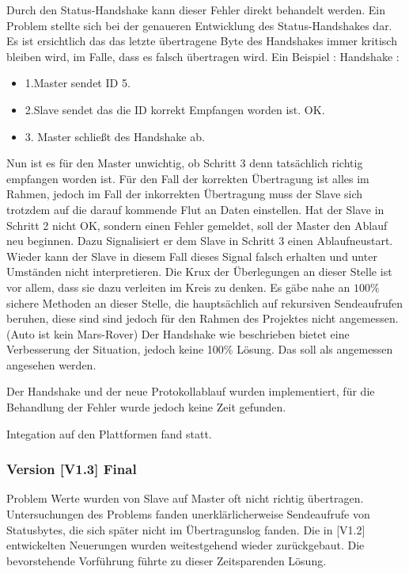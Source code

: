 \begin{itemize}
\begin{center}
\begin{center}

Durch den Status-Handshake kann dieser Fehler direkt behandelt werden.
Ein Problem stellte sich bei der genaueren Entwicklung des Status-Handshakes dar. Es ist ersichtlich das das letzte übertragene Byte des Handshakes immer kritisch bleiben wird, im Falle, dass es falsch übertragen wird. Ein Beispiel :
Handshake :
\begin{itemize}
	\item 1.Master sendet ID 5.
	\item 2.Slave sendet das die ID korrekt Empfangen worden ist. OK.
	\item 3. Master schließt des Handshake ab.
\end{itemize}

Nun ist es für den Master unwichtig, ob Schritt 3 denn tatsächlich richtig empfangen worden ist. Für den Fall der korrekten Übertragung ist alles im Rahmen, jedoch im Fall der inkorrekten Übertragung muss der Slave sich trotzdem auf die darauf kommende Flut an Daten einstellen.
Hat der Slave in Schritt 2 nicht OK, sondern einen Fehler gemeldet, soll der Master den Ablauf neu beginnen. Dazu Signalisiert er dem Slave in Schritt 3 einen Ablaufneustart. Wieder kann der Slave in diesem Fall dieses Signal falsch erhalten und unter Umständen nicht interpretieren.
Die Krux der Überlegungen an dieser Stelle ist vor allem, dass sie dazu verleiten im Kreis zu denken. Es gäbe 
nahe an $100\%$ sichere Methoden an dieser Stelle, die hauptsächlich auf rekursiven Sendeaufrufen beruhen, diese sind sind jedoch für den Rahmen des Projektes nicht angemessen.(Auto ist kein Mars-Rover)
Der Handshake wie beschrieben bietet eine Verbesserung der Situation, jedoch keine 100\% Lösung. Das soll als angemessen angesehen werden.

Der Handshake und der neue Protokollablauf wurden implementiert, für die Behandlung der Fehler wurde jedoch keine Zeit gefunden.

Integation auf den Plattformen fand statt.


\subsubsection{Version [V1.3] Final}
Problem Werte wurden von Slave auf Master oft nicht richtig übertragen. Untersuchungen des Problems fanden unerklärlicherweise Sendeaufrufe von Statusbytes, die sich später nicht im Übertragunslog fanden. Die in [V1.2] entwickelten Neuerungen wurden weitestgehend wieder zurückgebaut. Die bevorstehende Vorführung führte zu dieser Zeitsparenden Lösung.


\end{center}
\end{center}
\end{itemize}
